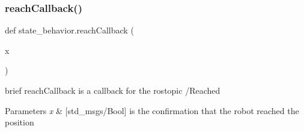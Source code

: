\subsubsection{\texorpdfstring{reach\+Callback()}{reachCallback()}}
{\footnotesize\ttfamily def state\+\_\+behavior.\+reach\+Callback (\begin{DoxyParamCaption}\item[{}]{x }\end{DoxyParamCaption})}



brief reach\+Callback is a callback for the rostopic /\+Reached 


\begin{DoxyParams}{Parameters}
{\em x} & \mbox{[}std\+\_\+msgs/\+Bool\mbox{]} is the confirmation that the robot reached the position \\
\hline
\end{DoxyParams}
